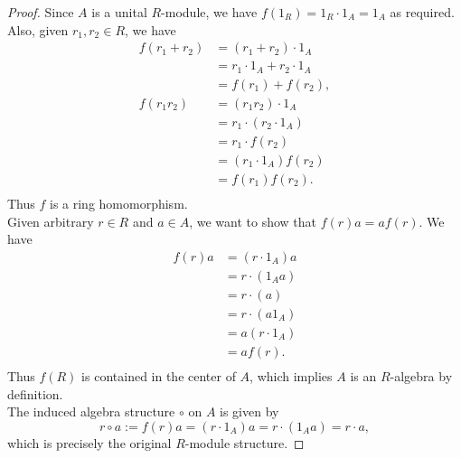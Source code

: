 \documentclass{article}
\begin{document}
  \begin{proof}
    Since $A$ is a unital $R$-module, we have $f(1_R)=1_R\cdot1_A=1_A$ as
    required. Also, given $r_1,r_2\in R$, we have
    \begin{align*}
      f(r_1+r_2) &=(r_1+r_2)\cdot1_A \\
      &=r_1\cdot1_A + r_2\cdot1_A \\
      &=f(r_1)+f(r_2), \\
      f(r_1r_2) &=(r_1r_2)\cdot1_A \\
      &=r_1\cdot(r_2\cdot1_A) \\
      &=r_1\cdot f(r_2) \\
      &=(r_1\cdot1_A)f(r_2) \\
      &=f(r_1)f(r_2). \\
    \end{align*}
    Thus $f$ is a ring homomorphism. \\

    Given arbitrary $r\in R$ and $a\in A$, we want to show that
    $f(r)a=af(r)$. We have
    \begin{align*}
      f(r)a &=(r\cdot1_A)a \\
      &=r\cdot(1_Aa) \\
      &=r\cdot(a) \\
      &=r\cdot(a1_A) \\
      &=a(r\cdot1_A) \\
      &=af(r). \\
    \end{align*}
    Thus $f(R)$ is contained in the center of $A$, which implies $A$ is an
    $R$-algebra by definition. \\

    The induced algebra structure $\circ$ on $A$ is given by
    \[r\circ a:=f(r)a=(r\cdot1_A)a=r\cdot(1_Aa)=r\cdot a,\]
    which is precisely the original $R$-module structure.
  \end{proof}
\end{document}
